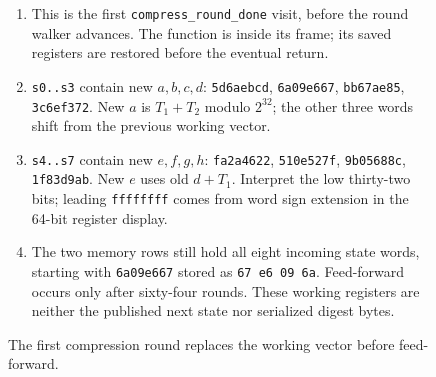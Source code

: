 \begin{figure}[htbp]
  \par\smallskip
  \begin{minipage}{\linewidth}
    \small
    \begin{enumerate}
      \setlength{\itemsep}{0pt}
            \setlength{\parsep}{0pt}
      \item This is the first \texttt{compress\_round\_done} visit, before the round walker advances. The function is inside its frame; its saved registers are restored before the eventual return.
      \item \texttt{s0..s3} contain new $a,b,c,d$: \texttt{5d6aebcd}, \texttt{6a09e667}, \texttt{bb67ae85}, \texttt{3c6ef372}. New $a$ is $T_1+T_2$ modulo $2^{32}$; the other three words shift from the previous working vector.
      \item \texttt{s4..s7} contain new $e,f,g,h$: \texttt{fa2a4622}, \texttt{510e527f}, \texttt{9b05688c}, \texttt{1f83d9ab}. New $e$ uses old $d+T_1$. Interpret the low thirty-two bits; leading \texttt{ffffffff} comes from word sign extension in the 64-bit register display.
      \item The two memory rows still hold all eight incoming state words, starting with \texttt{6a09e667} stored as \texttt{67 e6 09 6a}. Feed-forward occurs only after sixty-four rounds. These working registers are neither the published next state nor serialized digest bytes.
    \end{enumerate}
  \end{minipage}
  \caption{The first compression round replaces the working vector before feed-forward.}
  \label{capture:025-sha256-f02}
  \label{sha-f02}
\end{figure}
\par
